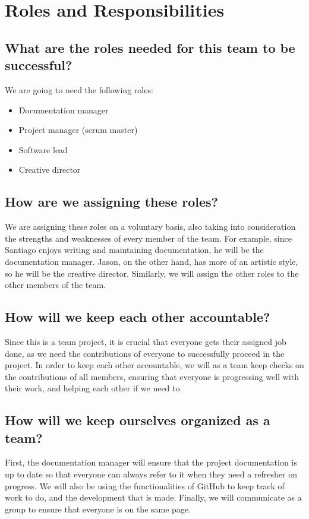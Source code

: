 \documentclass[11pt]{article}
\begin{document}
\section*{Roles and Responsibilities}
\subsection*{What are the roles needed for this team to be successful?}
We are going to need the following roles:
\begin{itemize}
    \item Documentation manager
    \item Project manager (scrum master)
    \item Software lead
    \item Creative director
\end{itemize}
\subsection*{How are we assigning these roles?}
We are assigning these roles on a voluntary basis, also taking into consideration the strengths and weaknesses of every member of the team. For example, since Santiago enjoys writing and maintaining documentation, he will be the documentation manager. Jason, on the other hand, has more of an artistic style, so he will be the creative director. Similarly, we will assign the other roles to the other members of the team.  
\subsection*{How will we keep each other accountable?}
Since this is a team project, it is crucial that everyone gets their assigned job done, as we need the contributions of everyone to successfully proceed in the project. In order to keep each other accountable, we will as a team keep checks on the contributions of all members, ensuring that everyone is progressing well with their work, and helping each other if we need to.
\subsection*{How will we keep ourselves organized as a team?}
First, the documentation manager will ensure that the project documentation is up to date so that everyone can always refer to it when they need a refresher on progress. We will also be using the functionalities of GitHub to keep track of work to do, and the development that is made. Finally, we will communicate as a group to ensure that everyone is on the same page. 
\end{document}
